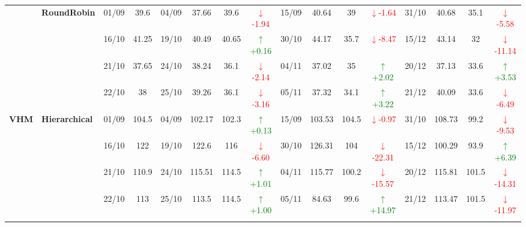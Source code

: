 {\begin{longtable}{llcc|cccc|cccc|cccc}
& \textbf{RoundRobin}
& 01/09 & 39.6 & 04/09 & 37.66 & 39.6 & \textcolor{red}{\(\downarrow\)-1.94} & 15/09 & 40.64 & 39 & \textcolor{red}{\(\downarrow\)-1.64} & 31/10 & 40.68 & 35.1 & \textcolor{red}{\(\downarrow\)-5.58} \\

&
& 16/10 & 41.25 & 19/10 & 40.49 & 40.65 & \textcolor{green}{\(\uparrow\)+0.16} & 30/10 & 44.17 & 35.7 & \textcolor{red}{\(\downarrow\)-8.47} & 15/12 & 43.14 & 32 & \textcolor{red}{\(\downarrow\)-11.14} \\

&
& 21/10 & 37.65 & 24/10 & 38.24 & 36.1 & \textcolor{red}{\(\downarrow\)-2.14} & 04/11 & 37.02 & 35 & \textcolor{green}{\(\uparrow\)+2.02} & 20/12 & 37.13 & 33.6 & \textcolor{green}{\(\uparrow\)+3.53} \\

&
& 22/10 & 38 & 25/10 & 39.26 & 36.1 & \textcolor{red}{\(\downarrow\)-3.16} & 05/11 & 37.32 & 34.1 & \textcolor{green}{\(\uparrow\)+3.22} & 21/12 & 40.09 & 33.6 & \textcolor{red}{\(\downarrow\)-6.49} \\
\midrule




\multirow{12}{*}{\textbf{VHM}} 
& \textbf{Hierarchical}
& 01/09 & 104.5 & 04/09 & 102.17 & 102.3 & \textcolor{green}{\(\uparrow\)+0.13} & 15/09 & 103.53 & 104.5 & \textcolor{red}{\(\downarrow\)-0.97} & 31/10 & 108.73 & 99.2 & \textcolor{red}{\(\downarrow\)-9.53} \\

&
& 16/10 & 122 & 19/10 & 122.6 & 116 & \textcolor{red}{\(\downarrow\)-6.60} & 30/10 & 126.31 & 104 & \textcolor{red}{\(\downarrow\)-22.31} & 15/12 & 100.29 & 93.9 & \textcolor{green}{\(\uparrow\)+6.39} \\

&
& 21/10 & 110.9 & 24/10 & 115.51 & 114.5 & \textcolor{green}{\(\uparrow\)+1.01} & 04/11 & 115.77 & 100.2 & \textcolor{red}{\(\downarrow\)-15.57} & 20/12 & 115.81 & 101.5 & \textcolor{red}{\(\downarrow\)-14.31} \\

&
& 22/10 & 113 & 25/10 & 113.5 & 114.5 & \textcolor{green}{\(\uparrow\)+1.00} & 05/11 & 84.63 & 99.6 & \textcolor{green}{\(\uparrow\)+14.97} & 21/12 & 113.47 & 101.5 & \textcolor{red}{\(\downarrow\)-11.97} \\
\cmidrule(lr){2-16}



\end{longtable}}
